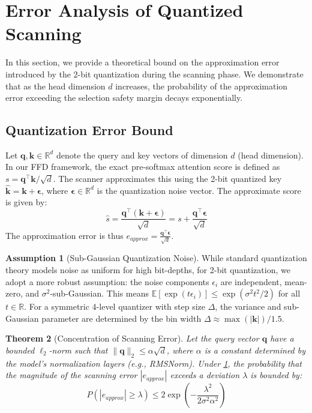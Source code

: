 \documentclass[]{mosi}
\theoremstyle{plain}
\newtheorem{theorem}{Theorem}[section]
\theoremstyle{definition}
\newtheorem{assumption}[theorem]{Assumption}
\theoremstyle{remark}
\begin{document}
\section{Error Analysis of Quantized Scanning}
\label{app:error_analysis}

In this section, we provide a theoretical bound on the approximation error introduced by the 2-bit quantization during the scanning phase. We demonstrate that as the head dimension $d$ increases, the probability of the approximation error exceeding the selection safety margin decays exponentially.

\subsection{Quantization Error Bound}

Let $\mathbf{q}, \mathbf{k} \in \mathbb{R}^d$ denote the query and key vectors of dimension $d$ (head dimension). In our FFD framework, the exact pre-softmax attention score is defined as $s = \mathbf{q}^\top \mathbf{k} / \sqrt{d}$. The scanner approximates this using the 2-bit quantized key $\hat{\mathbf{k}} = \mathbf{k} + \mathbf{\epsilon}$, where $\mathbf{\epsilon} \in \mathbb{R}^d$ is the quantization noise vector. The approximate score is given by:
\begin{equation}
    \hat{s} = \frac{\mathbf{q}^\top (\mathbf{k} + \mathbf{\epsilon})}{\sqrt{d}} = s + \frac{\mathbf{q}^\top \mathbf{\epsilon}}{\sqrt{d}}
\end{equation}
The approximation error is thus $e_{approx} = \frac{\mathbf{q}^\top \mathbf{\epsilon}}{\sqrt{d}}$.

\begin{assumption}[Sub-Gaussian Quantization Noise]
\label{ass:subgaussian}
While standard quantization theory models noise as uniform for high bit-depths, for 2-bit quantization, we adopt a more robust assumption: the noise components $\epsilon_i$ are independent, mean-zero, and $\sigma^2$-sub-Gaussian. This means $\mathbb{E}[\exp(t\epsilon_i)] \le \exp(\sigma^2 t^2 / 2)$ for all $t \in \mathbb{R}$. For a symmetric 4-level quantizer with step size $\Delta$, the variance and sub-Gaussian parameter are determined by the bin width $\Delta \approx \max(|\mathbf{k}|)/1.5$.
\end{assumption}

\begin{theorem}[Concentration of Scanning Error]
\label{thm:concentration_error}
Let the query vector $\mathbf{q}$ have a bounded $\ell_2$-norm such that $\|\mathbf{q}\|_2 \le \alpha \sqrt{d}$, where $\alpha$ is a constant determined by the model's normalization layers (e.g., RMSNorm). Under \cref{ass:subgaussian}, the probability that the magnitude of the scanning error $|e_{approx}|$ exceeds a deviation $\lambda$ is bounded by:
\begin{equation}
    P(|e_{approx}| \ge \lambda) \le 2 \exp \left( -\frac{\lambda^2}{2 \sigma^2 \alpha^2} \right)
\end{equation}
\end{theorem}
\end{document}
